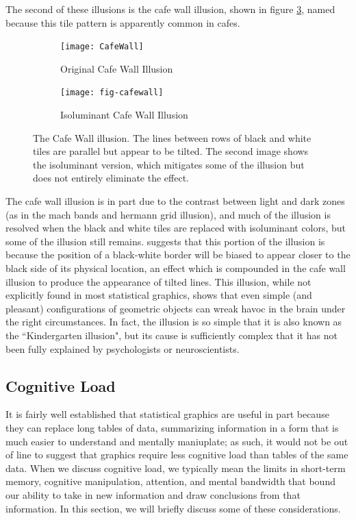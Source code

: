 \documentclass[11pt]{isuthesis}\usepackage[]{graphicx}\usepackage[]{color}
\begin{document}
The second of these illusions is the cafe wall illusion, shown in figure \ref{fig:cafewall}, named because this tile pattern is apparently common in cafes. 



\begin{figure}[htbp]\centering
\hfil
\begin{subfigure}[b]{.4\textwidth}\centering
  \texttt{[image: CafeWall]}
  \caption{Original Cafe Wall Illusion}\label{fig:CafeWallOrig}
\end{subfigure}\hfil
\begin{subfigure}[b]{.4\textwidth}\centering
  \texttt{[image: fig-cafewall]}
  \caption{Isoluminant Cafe Wall Illusion}\label{fig:CafeWallIso}
\end{subfigure}\hfil
\caption[Cafe Wall Illusion]{The Cafe Wall illusion. The lines between rows of black and white tiles are parallel but appear to be tilted. The second image shows the isoluminant version, which mitigates some of the illusion but does not entirely eliminate the effect.}\label{fig:cafewall}
\end{figure}

The cafe wall illusion is in part due to the contrast between light and dark zones (as in the mach bands and hermann grid illusion), and much of the illusion is resolved when the black and white tiles are replaced with isoluminant colors, but some of the illusion still remains. \citet{westheimer2007irradiation} suggests that this portion of the illusion is because the position of a black-white border will be biased to appear closer to the black side of its physical location, an effect which is compounded in the cafe wall illusion to produce the appearance of tilted lines. This illusion, while not explicitly found in most statistical graphics, shows that even simple (and pleasant) configurations of geometric objects can wreak havoc in the brain under the right circumstances. In fact, the illusion is so simple that it is also known as the ``Kindergarten illusion", but its cause is sufficiently complex that it has not been fully explained by psychologists or neuroscientists. 

\subsection{Cognitive Load}\label{cognitiveload}
It is fairly well established that statistical graphics are useful in part because they can replace long tables of data, summarizing information in a form that is much easier to understand and mentally maniuplate; as such, it would not be out of line to suggest that graphics require less cognitive load than tables of the same data. When we discuss cognitive load, we typically mean the limits in short-term memory, cognitive manipulation, attention, and mental bandwidth that bound our ability to take in new information and draw conclusions from that information. In this section, we will briefly discuss some of these considerations. 
\end{document}

